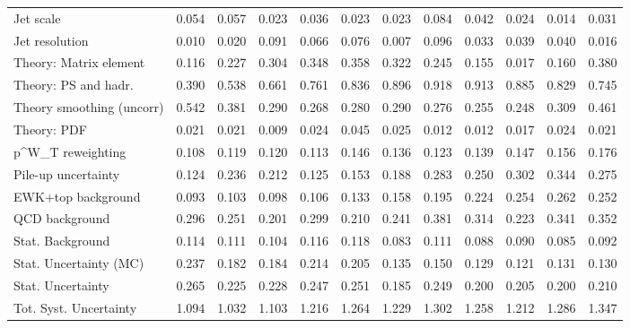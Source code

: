 \begin{tabular}{l|p{0.6cm}p{0.6cm}p{0.6cm}p{0.6cm}p{0.6cm}p{0.6cm}p{0.6cm}p{0.6cm}p{0.6cm}p{0.6cm}p{0.6cm}}
Jet scale                                & 0.054 & 0.057 & 0.023 & 0.036 & 0.023 & 0.023 & 0.084 & 0.042 & 0.024 & 0.014 & 0.031 \\
Jet resolution                           & 0.010 & 0.020 & 0.091 & 0.066 & 0.076 & 0.007 & 0.096 & 0.033 & 0.039 & 0.040 & 0.016 \\
Theory: Matrix element                   & 0.116 & 0.227 & 0.304 & 0.348 & 0.358 & 0.322 & 0.245 & 0.155 & 0.017 & 0.160 & 0.380 \\
Theory: PS and hadr.                     & 0.390 & 0.538 & 0.661 & 0.761 & 0.836 & 0.896 & 0.918 & 0.913 & 0.885 & 0.829 & 0.745 \\
Theory smoothing (uncorr)                & 0.542 & 0.381 & 0.290 & 0.268 & 0.280 & 0.290 & 0.276 & 0.255 & 0.248 & 0.309 & 0.461 \\
Theory: PDF                              & 0.021 & 0.021 & 0.009 & 0.024 & 0.045 & 0.025 & 0.012 & 0.012 & 0.017 & 0.024 & 0.021 \\
p^{W}_{T} reweighting                    & 0.108 & 0.119 & 0.120 & 0.113 & 0.146 & 0.136 & 0.123 & 0.139 & 0.147 & 0.156 & 0.176 \\
Pile-up uncertainty                      & 0.124 & 0.236 & 0.212 & 0.125 & 0.153 & 0.188 & 0.283 & 0.250 & 0.302 & 0.344 & 0.275 \\
EWK+top background                       & 0.093 & 0.103 & 0.098 & 0.106 & 0.133 & 0.158 & 0.195 & 0.224 & 0.254 & 0.262 & 0.252 \\
QCD background                           & 0.296 & 0.251 & 0.201 & 0.299 & 0.210 & 0.241 & 0.381 & 0.314 & 0.223 & 0.341 & 0.352 \\
Stat. Background                         & 0.114 & 0.111 & 0.104 & 0.116 & 0.118 & 0.083 & 0.111 & 0.088 & 0.090 & 0.085 & 0.092 \\
Stat. Uncertainty (MC)                   & 0.237 & 0.182 & 0.184 & 0.214 & 0.205 & 0.135 & 0.150 & 0.129 & 0.121 & 0.131 & 0.130 \\
\hline
Stat. Uncertainty                        & 0.265 & 0.225 & 0.228 & 0.247 & 0.251 & 0.185 & 0.249 & 0.200 & 0.205 & 0.200 & 0.210 \\
\hline
Tot. Syst. Uncertainty                   & 1.094 & 1.032 & 1.103 & 1.216 & 1.264 & 1.229 & 1.302 & 1.258 & 1.212 & 1.286 & 1.347 \\
\hline
\end{tabular}
